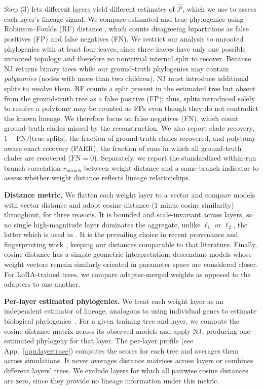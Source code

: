 \documentclass{article}
\theoremstyle{definition}
\theoremstyle{plain}
\begin{document}
Step (3) lets different layers yield different estimates of $\widehat{\mathcal{P}}$, which we use to
assess each layer's lineage signal. We compare estimated and true phylogenies using Robinson--Foulds (RF) distance \citep{robinson1981comparison}, which counts disagreeing bipartitions as false positives (FP) and false negatives (FN). We restrict our analysis to unrooted phylogenies with at least four leaves, since three leaves have only one possible unrooted topology and therefore no nontrivial internal split to recover. Because NJ returns binary trees while our ground-truth phylogenies may contain \textit{polytomies} (nodes with more than two children), NJ must introduce additional splits to resolve them. RF counts a split present in the estimated tree but absent from the ground-truth tree as a false positive (FP); thus, splits introduced solely to resolve a polytomy may be counted as FPs even though they do not contradict the known lineage. We therefore focus on false negatives (FN), which count ground-truth clades missed by the reconstruction. We also report clade recovery, $1-\mathrm{FN}/|\text{true splits}|$, the fraction of ground-truth clades recovered, and polytomy-aware exact recovery (PAER), the fraction of runs in which all ground-truth clades are recovered ($\mathrm{FN}=0$). Separately, we report the standardized within-run branch correlation $r_{\mathrm{branch}}$ between weight distance and a same-branch indicator to assess whether weight distance reflects lineage relationships.



\textbf{Distance metric.}\label{sec:framework:metric}
We flatten each weight layer to a vector and compare models with vector distance and adopt cosine distance ($1$ minus cosine
similarity) throughout, for three reasons. It is bounded and scale-invariant across layers, so no single
high-magnitude layer dominates the aggregate, unlike $\ell_1$ or $\ell_2$, the latter which is used in \cite{horwitz2025mother}. It is the prevailing choice in
recent provenance and fingerprinting work \citep{zeng2024huref, behavioral2026provenance,
zhu2025independence}, keeping our distances comparable to that literature. Finally, cosine distance has a simple geometric interpretation: descendant models whose weight vectors remain similarly oriented in parameter space are considered closer. For LoRA-trained trees, we compare adapter-merged weights as opposed to the adapters to one another.



\textbf{Per-layer estimated phylogenies.}
We treat each weight layer as an independent estimator of lineage, analogous to using individual
genes to estimate biological phylogenies~\citep{maddison1997gene}. For a given training tree and
layer, we compute the cosine distance matrix across its observed models and apply NJ, producing one
estimated phylogeny for that layer.  The per-layer profile (see App.~\ref{app:layertrace}) computes the scores for each tree and averages them across simulations. It never averages distance
matrices across layers or combines different layers' trees. We exclude layers for which all pairwise
cosine distances are zero, since they provide no lineage information under this metric.
\end{document}
